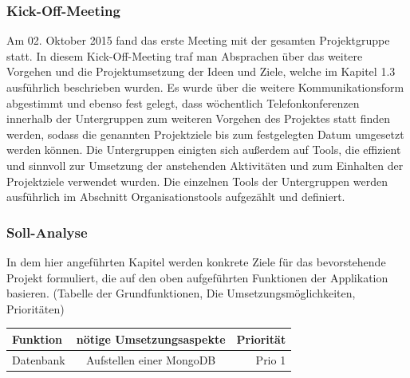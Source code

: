 \documentclass[12pt,a4paper]{article}
\begin{document}
\subsubsection{Kick-Off-Meeting}
Am 02. Oktober  2015 fand das erste Meeting mit der gesamten Projektgruppe statt. In diesem Kick-Off-Meeting traf man Absprachen über das weitere Vorgehen und die Projektumsetzung der Ideen und Ziele, welche im Kapitel 1.3 ausführlich beschrieben wurden. Es wurde über die weitere Kommunikationsform abgestimmt und ebenso fest gelegt, dass wöchentlich Telefonkonferenzen innerhalb der Untergruppen zum weiteren Vorgehen des Projektes statt finden werden, sodass die genannten Projektziele bis zum festgelegten Datum umgesetzt werden können. 
Die Untergruppen einigten sich außerdem auf Tools, die effizient und sinnvoll zur Umsetzung der anstehenden Aktivitäten und zum Einhalten der Projektziele verwendet wurden. Die einzelnen Tools der Untergruppen werden ausführlich im Abschnitt Organisationstools aufgezählt und definiert.
\newpage

\subsubsection{Soll-Analyse}
In dem hier angeführten Kapitel werden konkrete Ziele für das bevorstehende Projekt formuliert, die auf den oben aufgeführten Funktionen der Applikation basieren. (Tabelle der Grundfunktionen, Die Umsetzungsmöglichkeiten, Prioritäten)

\begin{tabular}{|l|c|r|}
\hline
 Funktion & nötige Umsetzungsaspekte & Priorität \\
\hline
Datenbank & Aufstellen einer MongoDB & Prio 1\\
\end{tabular}
\end{document}
